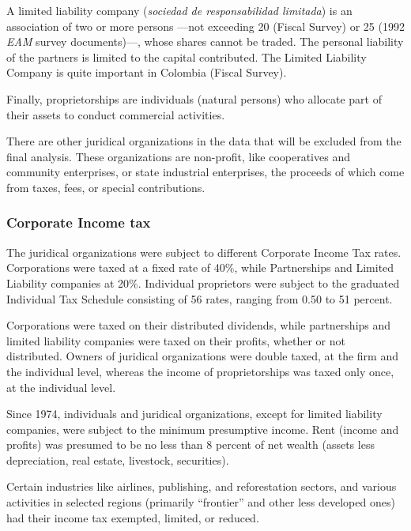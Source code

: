 \documentclass[
  12pt]{article}
\theoremstyle{definition}
\theoremstyle{remark}
\begin{document}
A limited liability company (\emph{sociedad de responsabilidad
limitada}) is an association of two or more persons ---not exceeding 20
(Fiscal Survey) or 25 (1992 \emph{EAM} survey documents)---, whose
shares cannot be traded. The personal liability of the partners is
limited to the capital contributed. The Limited Liability Company is
quite important in Colombia (Fiscal Survey).

Finally, proprietorships are individuals (natural persons) who allocate
part of their assets to conduct commercial activities.

There are other juridical organizations in the data that will be
excluded from the final analysis. These organizations are non-profit,
like cooperatives and community enterprises, or state industrial
enterprises, the proceeds of which come from taxes, fees, or special
contributions.

\subsubsection{Corporate Income tax}\label{corporate-income-tax}

The juridical organizations were subject to different Corporate Income
Tax rates. Corporations were taxed at a fixed rate of 40\%, while
Partnerships and Limited Liability companies at 20\%. Individual
proprietors were subject to the graduated Individual Tax Schedule
consisting of 56 rates, ranging from 0.50 to 51 percent.

Corporations were taxed on their distributed dividends, while
partnerships and limited liability companies were taxed on their
profits, whether or not distributed. Owners of juridical organizations
were double taxed, at the firm and the individual level, whereas the
income of proprietorships was taxed only once, at the individual level.

Since 1974, individuals and juridical organizations, except for limited
liability companies, were subject to the minimum presumptive income.
Rent (income and profits) was presumed to be no less than 8 percent of
net wealth (assets less depreciation, real estate, livestock,
securities).

Certain industries like airlines, publishing, and reforestation sectors,
and various activities in selected regions (primarily ``frontier'' and
other less developed ones) had their income tax exempted, limited, or
reduced.
\end{document}
